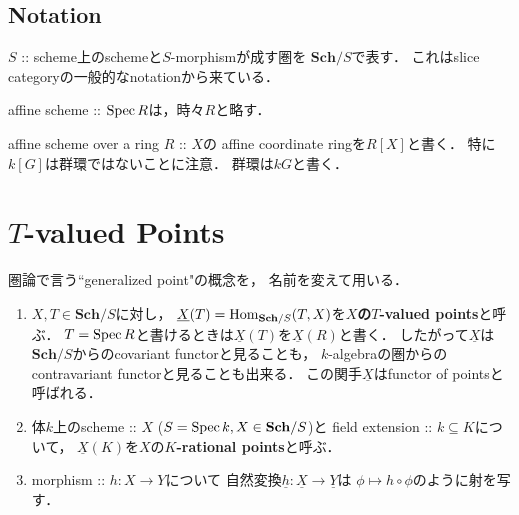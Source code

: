 \documentclass[a4paper]{jsarticle}
\newcommand{\Sch}{\mathbf{Sch}}
\newcommand{\func}[1]{\underline{#1}}
\begin{document}
\subsection*{Notation}
    $S$ :: scheme上のschemeと$S$-morphismが成す圏を
    \textbf{$\Sch/S$}で表す．
    これはslice categoryの一般的なnotationから来ている．
    
    affine scheme :: $\operatorname{Spec} R$は，時々$R$と略す．

    affine scheme over a ring $R$ :: $X$の
    affine coordinate ringを$R[X]$と書く．
    特に$k[G]$は群環ではないことに注意．
    群環は$kG$と書く．

\section{\texorpdfstring{$T$}{T}-valued Points}
    圏論で言う``generalized point"の概念を，
    名前を変えて用いる．

    \begin{Def}
    \enumfix
    \begin{enumerate}[label=(\roman*),leftmargin=*]
    \item 
    $X, T \in \Sch/S$に対し，
    $\func{X}(T)=\Hom_{\Sch/S}(T,X)$を\textbf{$X$の$T$-valued points}と呼ぶ．
    $T=\operatorname{Spec} R$と書けるときは$\func{X}(T)$を$\func{X}(R)$と書く．
    したがって$\func{X}$は$\Sch/S$からのcovariant functorと見ることも，
    $k$-algebraの圏からのcontravariant functorと見ることも出来る．
    この関手$\func{X}$はfunctor of pointsと呼ばれる．

    \item
    体$k$上のscheme :: $X$ ($S=\Spec k, X \in \Sch/S$)と
    field extension :: $k \subseteq K$について，
    $\func{X}(K)$を$X$の\textbf{$K$-rational points}と呼ぶ．

    \item
    morphism :: $h: X \to Y$について
    自然変換$\func{h}: \func{X} \to \func{Y}$は
    $\phi \mapsto h \circ \phi$のように射を写す．
    \end{enumerate}
    \end{Def}
\end{document}
